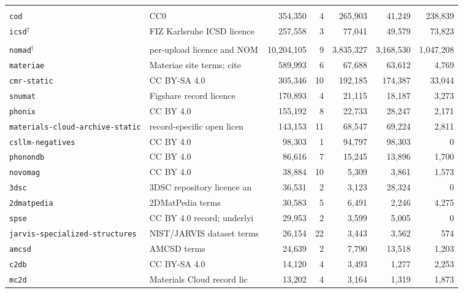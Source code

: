 \begin{table}[htbp]
\begin{tabular}{llrrrrr}
\addlinespace[2pt]
\multicolumn{7}{l}{\textit{Experimental structure catalogues}} \\[1pt]
\quad \texttt{cod} & CC0 & 354{,}350 & 4 & 265{,}903 & 41{,}249 & 238{,}839 \\
\quad \texttt{icsd}$^{\dagger}$ & FIZ Karlsruhe ICSD licence & 257{,}558 & 3 & 77{,}041 & 49{,}579 & 73{,}823 \\
\addlinespace[2pt]
\multicolumn{7}{l}{\textit{Specialised property libraries}} \\[1pt]
\quad \texttt{nomad}$^{\dagger}$ & per-upload licence and NOM & 10{,}204{,}105 & 9 & 3{,}835{,}327 & 3{,}168{,}530 & 1{,}047{,}208 \\
\quad \texttt{materiae} & Materiae site terms; cite  & 589{,}993 & 6 & 67{,}688 & 63{,}612 & 4{,}769 \\
\quad \texttt{cmr-static} & CC BY-SA 4.0 & 305{,}346 & 10 & 192{,}185 & 174{,}387 & 33{,}044 \\
\quad \texttt{snumat} & Figshare record licence & 170{,}893 & 4 & 21{,}115 & 18{,}187 & 3{,}273 \\
\quad \texttt{phonix} & CC BY 4.0 & 155{,}192 & 8 & 22{,}733 & 28{,}247 & 2{,}171 \\
\quad \texttt{materials-cloud-archive-static} & record-specific open licen & 143{,}153 & 11 & 68{,}547 & 69{,}224 & 2{,}811 \\
\quad \texttt{csllm-negatives} & CC BY 4.0 & 98{,}303 & 1 & 94{,}797 & 98{,}303 & 0 \\
\quad \texttt{phonondb} & CC BY 4.0 & 86{,}616 & 7 & 15{,}245 & 13{,}896 & 1{,}700 \\
\quad \texttt{novomag} & CC BY 4.0 & 38{,}884 & 10 & 5{,}309 & 3{,}861 & 1{,}573 \\
\quad \texttt{3dsc} & 3DSC repository licence an & 36{,}531 & 2 & 3{,}123 & 28{,}324 & 0 \\
\quad \texttt{2dmatpedia} & 2DMatPedia terms & 30{,}583 & 5 & 6{,}491 & 2{,}246 & 4{,}275 \\
\quad \texttt{spse} & CC BY 4.0 record; underlyi & 29{,}953 & 2 & 3{,}599 & 5{,}005 & 0 \\
\quad \texttt{jarvis-specialized-structures} & NIST/JARVIS dataset terms & 26{,}154 & 22 & 3{,}443 & 3{,}562 & 574 \\
\quad \texttt{amcsd} & AMCSD terms & 24{,}639 & 2 & 7{,}790 & 13{,}518 & 1{,}203 \\
\quad \texttt{c2db} & CC BY-SA 4.0 & 14{,}120 & 4 & 3{,}493 & 1{,}277 & 2{,}253 \\
\quad \texttt{mc2d} & Materials Cloud record lic & 13{,}202 & 4 & 3{,}164 & 1{,}319 & 1{,}873 \\

\end{tabular}
\end{table}
